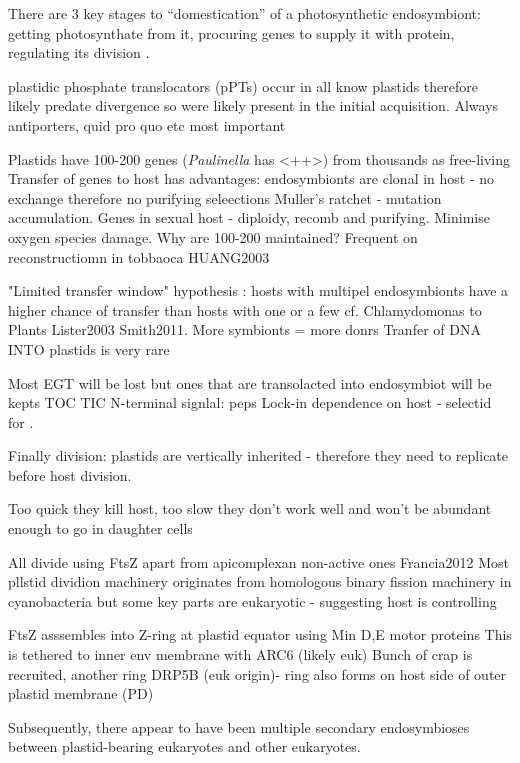 There are 3 key stages to ``domestication'' of a photosynthetic endosymbiont: getting photosynthate from it,
procuring genes to supply it with protein, regulating its division \citep{McFadden2014}.

plastidic phosphate translocators (pPTs) occur in all know plastids therefore likely predate divergence so were
likely present in the initial acquisition.  Always antiporters, quid pro quo etc  most important


Plastids have 100-200 genes (\textit{Paulinella} has <++>) from thousands as free-living
Transfer of genes to host has advantages: endosymbionts are clonal in host - no exchange therefore no purifying seleections
Muller's ratchet - mutation accumulation.
Genes in sexual host - diploidy, recomb and purifying.
Minimise oxygen species damage.
Why are 100-200 maintained?
Frequent on reconstructiomn in tobbaoca HUANG2003

"Limited transfer window" hypothesis : hosts with multipel endosymbionts have a higher chance of transfer than hosts 
with one or a few cf. Chlamydomonas to Plants Lister2003 Smith2011. More symbionts = more donrs 
Tranfer of DNA INTO plastids is very rare  

Most EGT will be lost but ones that are transolacted into endosymbiot will be kepts TOC TIC N-terminal signlal: peps
Lock-in dependence on host - selectid for .


Finally division: plastids are vertically inherited - therefore they need to replicate before host division.

Too quick they kill host, too slow they don't work well and won't be abundant enough to go in daughter cells


All divide using FtsZ apart from apicomplexan non-active ones Francia2012
Most pllstid dividion machinery originates from homologous binary fission machinery in cyanobacteria
but some key parts are eukaryotic - suggesting host is controlling 

FtsZ asssembles into Z-ring at plastid equator using Min D,E motor proteins 
This is tethered to inner env membrane with ARC6 (likely euk)
Bunch of crap is recruited, another ring DRP5B (euk origin)- ring also forms on host side of outer plastid membrane (PD)
\citep{McFadden2014}









Subsequently, there appear to have been multiple secondary endosymbioses between plastid-bearing eukaryotes
and other eukaryotes.






